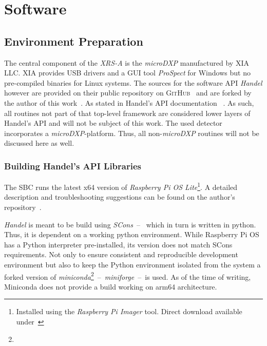 \chapter{Software}\label{chap:software}
    \section{Environment Preparation}\label{sec:env preperation}
        The central component of the \textit{XRS-A} is the \textit{microDXP} manufactured by \textsc{XIA LLC}.
        \textsc{XIA} provides USB drivers and a GUI tool \textit{ProSpect} for Windows but no pre-compiled binaries for Linux systems.
        The sources for the software API \textit{Handel} however are provided on their public repository on \textsc{GitHub}~\cite{Software.HandelRelease.2023} and are forked by the author of this work~\cite{Software.XraythesisHandel.2023}.
        As stated in Handel's API documentation ~\cite{Manual.HandelAPIManual.Xiang}.
        As such, all routines not part of that top-level framework are considered lower layers of Handel's API and will not be subject of this work.
        The used detector incorporates a \textit{microDXP}-platform.
        Thus, all non-\textit{microDXP} routines will not be discussed here as well.\par\medskip

        \subsection{Building Handel's API Libraries}\label{sec:software preperations}
            The SBC runs the latest x64 version of \textit{Raspberry Pi OS Lite}\footnote{Installed using the \textit{Raspberry Pi Imager} tool.
            Direct download available under~\cite{Software.RaspberryPiOSLite.2023}}.
            A detailed description and troubleshooting suggestions can be found on the author's repository~\cite{Software.XraythesisHandel.2023}.\par\medskip

            \textit{Handel} is meant to be build using \textit{SCons}~--~ which in turn is written in python.
            Thus, it is dependent on a working python environment.
            While Raspberry Pi OS has a Python interpreter pre-installed, its version does not match SCons requirements.
            Not only to ensure consistent and reproducible development environment but also to keep the Python environment isolated from the system a forked version of \textit{miniconda}\footnote{}~--~\textit{miniforge}~--~is used.
            As of the time of writing, Miniconda does not provide a build working on arm64 architecture.

